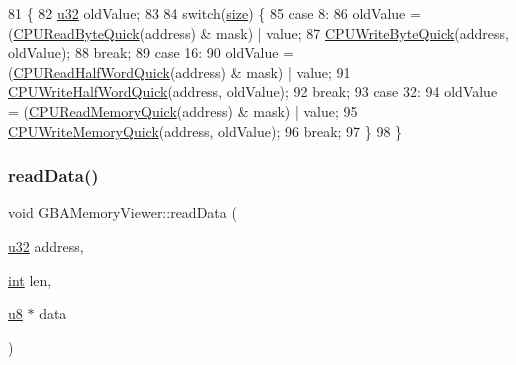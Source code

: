 \begin{DoxyCode}
81 \{
82   \mbox{\hyperlink{_system_8h_a10e94b422ef0c20dcdec20d31a1f5049}{u32}} oldValue;
83   
84   \textcolor{keywordflow}{switch}(\mbox{\hyperlink{expr-lex_8cpp_ab7d671599a7b25ca99a487fa341bc33a}{size}}) \{
85   \textcolor{keywordflow}{case} 8:
86     oldValue = (\mbox{\hyperlink{_memory_viewer_dlg_8cpp_ab9d417f7a58507a4fd4a574eb00d7106}{CPUReadByteQuick}}(address) & mask) | value;
87     \mbox{\hyperlink{_memory_viewer_dlg_8cpp_ae5009afd14501c6882caf998a3bb72c5}{CPUWriteByteQuick}}(address, oldValue);
88     \textcolor{keywordflow}{break};
89   \textcolor{keywordflow}{case} 16:
90     oldValue = (\mbox{\hyperlink{_memory_viewer_dlg_8cpp_a61e2bc29faecc87495deda27757cc7af}{CPUReadHalfWordQuick}}(address) & mask) | value;
91     \mbox{\hyperlink{_memory_viewer_dlg_8cpp_afd04f96dfbfca0c6a8f90b77e4870446}{CPUWriteHalfWordQuick}}(address, oldValue);
92     \textcolor{keywordflow}{break};
93   \textcolor{keywordflow}{case} 32:
94     oldValue = (\mbox{\hyperlink{_memory_viewer_dlg_8cpp_ae45f9b4e317620550878e8cd94d3e823}{CPUReadMemoryQuick}}(address) & mask) | value;
95     \mbox{\hyperlink{_memory_viewer_dlg_8cpp_acec74b80f73371b76dfb1f90ff1c25d4}{CPUWriteMemoryQuick}}(address, oldValue);
96     \textcolor{keywordflow}{break};
97   \}
98 \}
\end{DoxyCode}
\mbox{\label{class_g_b_a_memory_viewer_a443f550e4a3a065a0ae3a1142c678e91}} 
\subsubsection{\texorpdfstring{read\+Data()}{readData()}}
{\footnotesize\ttfamily void G\+B\+A\+Memory\+Viewer\+::read\+Data (\begin{DoxyParamCaption}\item[{\mbox{\hyperlink{_system_8h_a10e94b422ef0c20dcdec20d31a1f5049}{u32}}}]{address,  }\item[{\mbox{\hyperlink{_util_8cpp_a0ef32aa8672df19503a49fab2d0c8071}{int}}}]{len,  }\item[{\mbox{\hyperlink{_system_8h_aed742c436da53c1080638ce6ef7d13de}{u8}} $\ast$}]{data }\end{DoxyParamCaption})\hspace{0.3cm}{\ttfamily [virtual]}}



